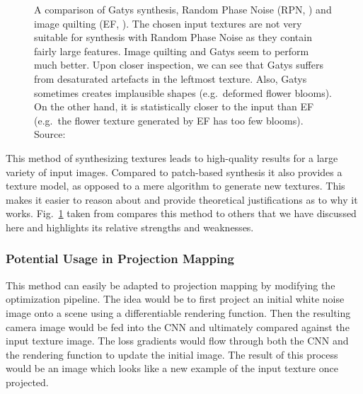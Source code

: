 \begin{figure}[h]
    \begin{subfigure}[b]{\textwidth}
        \centering
    \end{subfigure}
    \caption{A comparison of Gatys synthesis, Random Phase Noise (RPN, \citet{Galerne2011}) and image quilting (EF, \citet{Efros2001}). The chosen input textures are not very suitable for synthesis with Random Phase Noise as they contain fairly large features. Image quilting and Gatys seem to perform much better. Upon closer inspection, we can see that Gatys suffers from desaturated artefacts in the leftmost texture. Also, Gatys sometimes creates implausible shapes (e.g.~deformed flower blooms). On the other hand, it is statistically closer to the input than EF (e.g.~the flower texture generated by EF has too few blooms). Source: \citet{Raad2018}}
    \label{fig:background_synthesis_comparison}
\end{figure}

This method of synthesizing textures leads to high-quality results for a large variety of input images. Compared to patch-based synthesis it also provides a texture model, as opposed to a mere algorithm to generate new textures. This makes it easier to reason about and provide theoretical justifications as to why it works. Fig.~\ref{fig:background_synthesis_comparison} taken from \citet{Raad2018} compares this method to others that we have discussed here and highlights its relative strengths and weaknesses.

\subsubsection{Potential Usage in Projection Mapping}
\label{section:background-texture_synthesis-statistics_based-projection_mapping}

This method can easily be adapted to projection mapping by modifying the optimization pipeline. The idea would be to first project an initial white noise image onto a scene using a differentiable rendering function. Then the resulting camera image would be fed into the CNN and ultimately compared against the input texture image. The loss gradients would flow through both the CNN and the rendering function to update the initial image. The result of this process would be an image which looks like a new example of the input texture once projected.